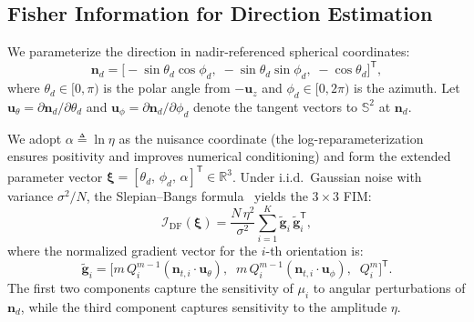 \documentclass[journal]{IEEEtran}
\newcommand{\added}[1]{{\color{blue}#1}}
\begin{document}
\added{\subsection{Fisher Information for Direction Estimation}
\label{subsec:FIM}

We parameterize the direction in nadir-referenced spherical coordinates:
\begin{equation}
\mathbf{n}_d = \bigl[-\sin\theta_d\cos\phi_d,\;-\sin\theta_d\sin\phi_d,\;-\cos\theta_d\bigr]^{\mathsf T},
\label{eq:nd_spherical}
\end{equation}
where $\theta_d\in[0,\pi)$ is the polar angle from $-\mathbf{u}_z$ and $\phi_d\in[0,2\pi)$ is the azimuth.  Let $\mathbf{u}_\theta = \partial\mathbf{n}_d/\partial\theta_d$ and $\mathbf{u}_\phi = \partial\mathbf{n}_d/\partial\phi_d$ denote the tangent vectors to $\mathbb{S}^2$ at $\mathbf{n}_d$.

We adopt $\alpha\triangleq\ln\eta$ as the nuisance coordinate (the log-reparameterization ensures positivity and improves numerical conditioning) and form the extended parameter vector $\boldsymbol{\xi}=[\theta_d,\,\phi_d,\,\alpha]^{\mathsf T}\in\mathbb{R}^3$.  Under i.i.d.\ Gaussian noise with variance $\sigma^2/N$, the Slepian--Bangs formula~\cite{Kay1993} yields the $3\times3$ FIM:
\begin{equation}
\mathcal{I}_{\mathrm{DF}}(\boldsymbol\xi)
= \frac{N\,\eta^2}{\sigma^2}
  \sum_{i=1}^{K}
  \tilde{\mathbf g}_i\,\tilde{\mathbf g}_i^{\mathsf T},
\label{eq:FIM_DEB}
\end{equation}
where the normalized gradient vector for the $i$-th orientation is:
\begin{equation}
\tilde{\mathbf g}_i = \bigl[m\,Q_i^{m-1}(\mathbf{n}_{t,i}\!\cdot\!\mathbf{u}_\theta),\;\;m\,Q_i^{m-1}(\mathbf{n}_{t,i}\!\cdot\!\mathbf{u}_\phi),\;\;Q_i^m\bigr]^{\mathsf T}.
\label{eq:grad_xi}
\end{equation}
The first two components capture the sensitivity of $\mu_i$ to angular perturbations of $\mathbf{n}_d$, while the third component captures sensitivity to the amplitude $\eta$.}
\end{document}
